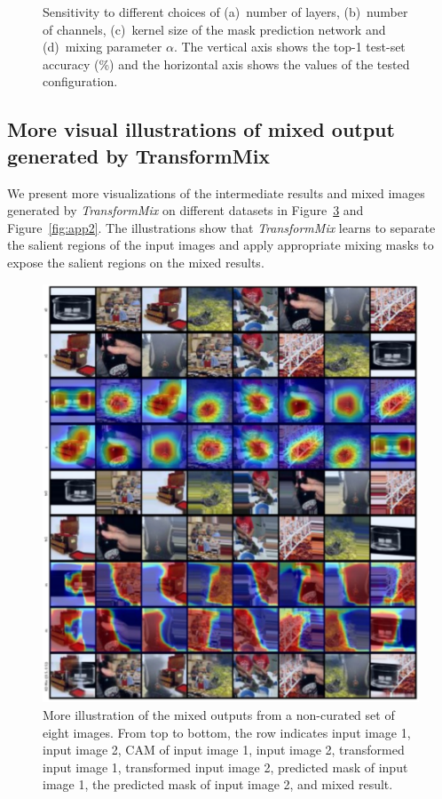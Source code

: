 \documentclass[10pt]{article} %
\newcommand{\TMIX}[0]{\textit{TransformMix }}
\begin{document}
\begin{figure}[ht]
\begin{center}
\begin{subfigure}[b]{0.22\linewidth}
\begin{center}
        \caption{}
        \label{fig:nalpha}
        \end{center}
    \end{subfigure}
    \end{center}
    \caption{Sensitivity to different choices of (a)~number of layers, (b)~number of channels, (c)~kernel size of the mask prediction network and (d)~mixing parameter $\alpha$. The vertical axis shows the top-1 test-set accuracy (\%) and the horizontal axis shows the values of the tested configuration.}
    \label{fig:ila_layers_compare}    
\end{figure}

\subsection{More visual illustrations of mixed output generated by TransformMix} \label{app:more_visuals}
We present more visualizations of the intermediate results and mixed images generated by \TMIX on different datasets in Figure~\ref{fig:app1} and Figure~\ref{fig:app2}. The illustrations show that \TMIX learns to separate the salient regions of the input images and apply appropriate mixing masks to expose the salient regions on the mixed results.

\begin{figure}[ht]
\centering
\includegraphics[width=\textwidth]{./img/tinyimagenet_appendix}
\caption{More illustration of the mixed outputs from a non-curated set of eight images. From top to bottom, the row indicates input image 1, input image 2, CAM of input image 1, input image 2, transformed input image 1, transformed input image 2, predicted mask of input image 1, the predicted mask of input image 2, and mixed result.}
\label{fig:app1}
\end{figure}
\end{document}
